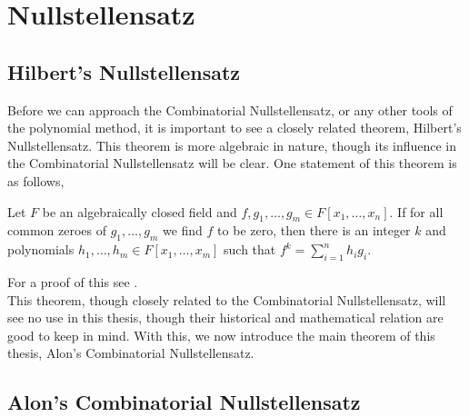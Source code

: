 \chapter{Nullstellensatz}
\section{Hilbert's Nullstellensatz}
Before we can approach the Combinatorial Nullstellensatz, or any other tools of the polynomial method, it is important to see a closely related theorem, Hilbert's Nullstellensatz. This theorem is more algebraic in nature, though its influence in the Combinatorial Nullstellensatz will be clear. One statement of this theorem is as follows,
\begin{theorem}
 Let \(F\) be an algebraically closed field and \(f, g_1, \ldots, g_{m} \in F\left[ x_1, \ldots, x_{n} \right] \). If for all common zeroes of \(g_1, \ldots, g_{m}\) we find \(f\) to be zero, then there is an integer \(k\) and polynomials \(h_1, \ldots, h_{m} \in F\left[ x_1, \ldots, x_{m} \right] \)  such that \(f^{k} = \sum_{i= 1}^{n} h_{i}g_{i}\).
\end{theorem}
For a proof of this see \cite{Waerden_1931}.\\
This theorem, though closely related to the Combinatorial Nullstellensatz, will see no use in this thesis, though their historical and mathematical relation are good to keep in mind. With this, we now introduce the main theorem of this thesis, Alon's Combinatorial Nullstellensatz.\newpage
	\section{Alon's Combinatorial Nullstellensatz}

